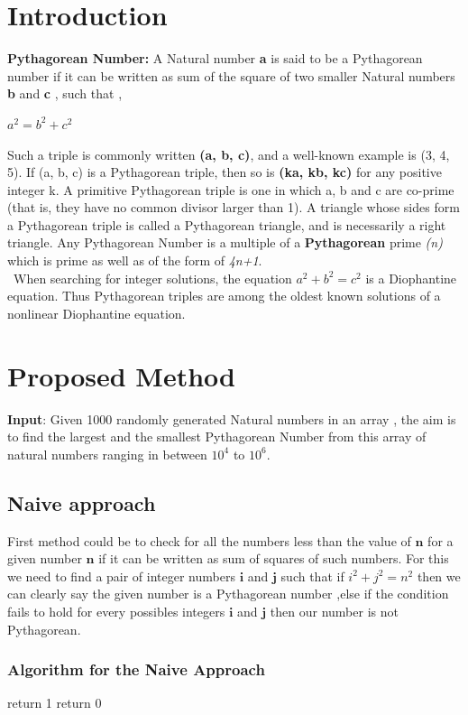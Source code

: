 \documentclass[twocolumn]{article}      %
\begin{document}
\section{Introduction}
{ \textbf{Pythagorean Number:}} A Natural number \textbf{a} is said to be a Pythagorean number if it can be written as sum of the square of two smaller Natural numbers \textbf{b} and \textbf{c} , such that ,
\begin{center}\textbf{$a^2 = b^2 + c^2$}\end{center}
Such a triple is commonly written \textbf{(a, b, c)}, and a well-known example is (3, 4, 5). If (a, b, c) is a Pythagorean triple, then so is \textbf{(ka, kb, kc)} for any positive integer k. A primitive Pythagorean triple is one in which a, b and c are co-prime (that is, they have no common divisor larger than 1). A triangle whose sides form a Pythagorean triple is called a Pythagorean triangle, and is necessarily a right triangle. Any Pythagorean Number is a multiple of a \textbf{Pythagorean} prime \textit{(n)} which is prime as well as of the form of \textit{4n+1}.\\\ When searching for integer solutions, the equation \textbf{$a^2 + b^2 = c^2$} is a Diophantine equation. Thus Pythagorean triples are among the oldest known solutions of a nonlinear Diophantine equation.
\section{Proposed Method}
\textbf{Input}: Given 1000 randomly generated Natural numbers in an array , the aim is to find the largest and the smallest Pythagorean Number from this array of natural numbers ranging in between $10^4$ to $10^6$.
\subsection {Naive approach}
First method could be to check for all the numbers less than the value of $\textbf{n}$ for a given number $\textbf{n}$ if it can be written as sum of squares of such numbers. For this we need to find a pair of integer numbers $\textbf{i}$ and $\textbf{j}$ such that if ${i^2 + j^2=n^2}$ then we can clearly say the given number is a Pythagorean number ,else if the condition fails to hold for every possibles integers $\textbf{i}$ and $\textbf{j}$ then our number is not Pythagorean.
\subsubsection{Algorithm for the Naive Approach}
\begin{algorithm}
\begin{algorithmic}[1]
\State return 1
\EndIf
\EndFor
\EndFor
\State return 0
\EndProcedure
\end{algorithmic}
\end{algorithm}
\end{document}
